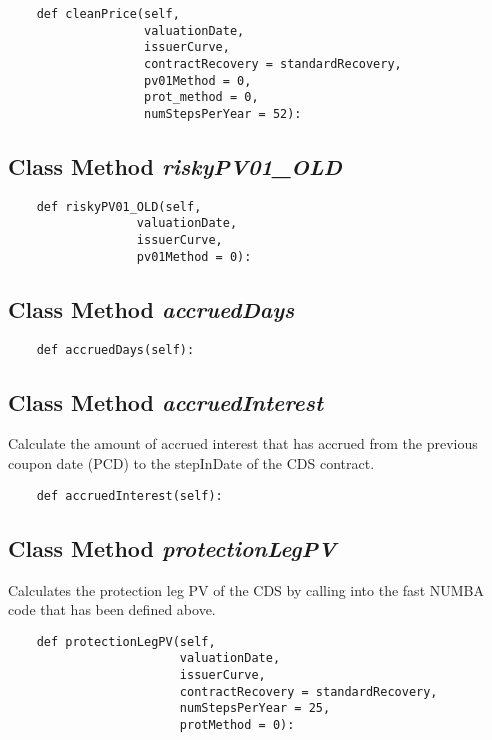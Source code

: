 \documentclass[twoside,11pt]{book}
\begin{document}
\begin{lstlisting}
    def cleanPrice(self,
                   valuationDate,
                   issuerCurve,
                   contractRecovery = standardRecovery,
                   pv01Method = 0,
                   prot_method = 0,
                   numStepsPerYear = 52):
\end{lstlisting}

\subsection{Class Method {\it riskyPV01\_OLD}}


\begin{lstlisting}
    def riskyPV01_OLD(self,
                  valuationDate,
                  issuerCurve,
                  pv01Method = 0):
\end{lstlisting}

\subsection{Class Method {\it accruedDays}}


\begin{lstlisting}
    def accruedDays(self):
\end{lstlisting}

\subsection{Class Method {\it accruedInterest}}
Calculate the amount of accrued interest that has accrued from the previous coupon date (PCD) to the stepInDate of the CDS contract. 

\begin{lstlisting}
    def accruedInterest(self):
\end{lstlisting}

\subsection{Class Method {\it protectionLegPV}}
Calculates the protection leg PV of the CDS by calling into the fast NUMBA code that has been defined above. 

\begin{lstlisting}
    def protectionLegPV(self,
                        valuationDate,
                        issuerCurve,
                        contractRecovery = standardRecovery,
                        numStepsPerYear = 25,
                        protMethod = 0):
\end{lstlisting}
\end{document}
